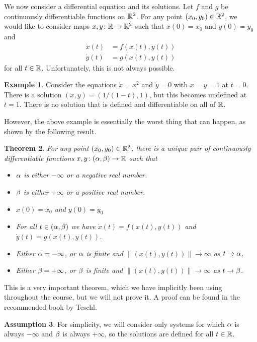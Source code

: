 \documentclass[reqno]{amsart}
\newtheorem{theorem}{Theorem}
\theoremstyle{definition}
\newtheorem{assumption}[theorem]{Assumption}
\newtheorem{example}[theorem]{Example}
\begin{document}
We now consider a differential equation and its solutions. Let $f$ and
$g$ be continuously differentiable functions on ${\mathbb{R}}^2$.  For any point
$(x_0,y_0)\in{\mathbb{R}}^2$, we would like to consider maps $x,y\colon{\mathbb{R}}\to{\mathbb{R}}^2$
such that $x(0)=x_0$ and $y(0)=y_0$ and
\begin{align*}
 \dot{x}(t) &= f(x(t),y(t)) \\
 \dot{y}(t) &= g(x(t),y(t))
\end{align*}
for all $t\in{\mathbb{R}}$.  Unfortunately, this is not always possible.  

\begin{example}
 Consider the equations $\dot{x}=x^2$ and $\dot{y}=0$ with $x=y=1$ at
 $t=0$.  There is a solution $(x,y)=(1/(1-t),1)$, but this becomes
 undefined at $t=1$.  There is no solution that is defined and
 differentiable on all of ${\mathbb{R}}$.
\end{example}

However, the above example is essentially the worst thing that can
happen, as shown by the following result.

\begin{theorem}
 For any point $(x_0,y_0)\in{\mathbb{R}}^2$, there is a unique pair of
 continuously differentiable functions $x,y\colon(\alpha,\beta)\to{\mathbb{R}}$ such that
 \begin{itemize}
  \item $\alpha$ is either $-\infty$ or a negative real number.
  \item $\beta$ is either $+\infty$ or a positive real number.
  \item $x(0)=x_0$ and $y(0)=y_0$
  \item For all $t\in(\alpha,\beta)$ we have $\dot{x}(t)=f(x(t),y(t))$ and
   $\dot{y}(t)=g(x(t),y(t))$.
  \item Either $\alpha=-\infty$, or $\alpha$ is finite and
   $\|(x(t),y(t))\|\to\infty$ as $t\to\alpha$.
  \item Either $\beta=+\infty$, or $\beta$ is finite and
   $\|(x(t),y(t))\|\to\infty$ as $t\to\beta$.
 \end{itemize}
\end{theorem}

This is a very important theorem, which we have implicitly been using
throughout the course, but we will not prove it.  A proof can be found
in the recommended book by Teschl.

\begin{assumption}
 For simplicity, we will consider only systems for which $\alpha$ is
 always $-\infty$ and $\beta$ is always $+\infty$, so the solutions are
 defined for all $t\in{\mathbb{R}}$.
\end{assumption}
\end{document}
